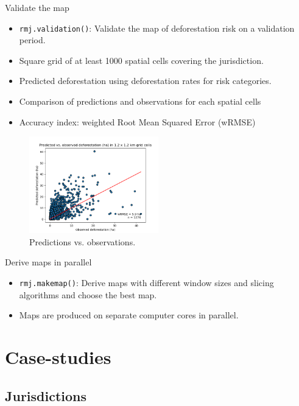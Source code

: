 \documentclass[10pt,table,dvipsnames,compress]{beamer}
\begin{document}
\begin{frame}[label={sec:org0dea292},fragile]{Validate the map}
 \begin{itemize}
\item \texttt{rmj.validation()}: Validate the map of deforestation risk on a validation period.
\item Square grid of at least 1000 spatial cells covering the jurisdiction.
\item Predicted deforestation using deforestation rates for risk categories.
\item Comparison of predictions and observations for each spatial cells
\item Accuracy index: weighted Root Mean Squared Error (wRMSE)
\end{itemize}

\begin{figure}[htbp]
\centering
\includegraphics[width=0.5\textwidth]{figs/pred_obs_ws5_ei.png}
\caption{\label{fig:org252304e}Predictions vs. observations.}
\end{figure}
\end{frame}

\begin{frame}[label={sec:org996d16a},fragile]{Derive maps in parallel}
 \begin{itemize}
\item \texttt{rmj.makemap()}: Derive maps with different window sizes and slicing algorithms and choose the best map.
\item Maps are produced on separate computer cores in parallel.
\end{itemize}
\end{frame}

\section{Case-studies}
\label{sec:orgd0b9608}

\subsection{Jurisdictions}
\label{sec:orgc59e8b9}
\end{document}
